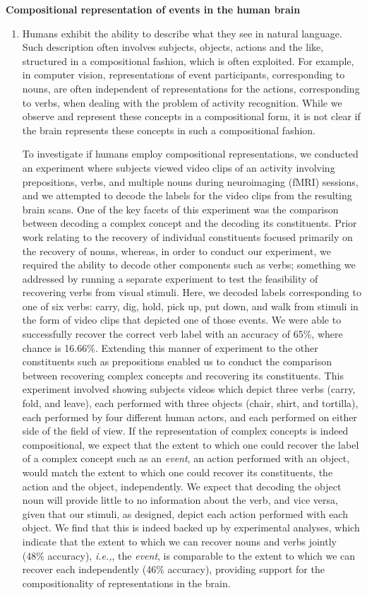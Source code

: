 \documentclass[10pt]{article}
\newenvironment{researchBlock}[1]{%
  \vspace*{0.5ex}
  {\large \textbf{#1}}
  \begin{enumerate}\item[]}
  {\end{enumerate}}
\newcommand{\ie}{\emph{i.e.,}}
\begin{document}
\begin{researchBlock} {Compositional representation of events in the human brain}
  Humans exhibit the ability to describe what they see in natural language.
  Such description often involves subjects, objects, actions and the like,
  structured in a compositional fashion, which is often exploited.
  For example, in computer vision, representations of event participants,
  corresponding to nouns, are often independent of representations for the
  actions, corresponding to verbs, when dealing with the problem of activity
  recognition.
  While we observe and represent these concepts in a compositional form, it is
  not clear if the brain represents these concepts in such a compositional
  fashion.

  To investigate if humans employ compositional representations, we conducted
  an experiment where subjects viewed video clips of an activity involving
  prepositions, verbs, and multiple nouns during neuroimaging (fMRI) sessions,
  and we attempted to decode the labels for the video clips from the resulting
  brain scans.
  One of the key facets of this experiment was the comparison between decoding
  a complex concept and the decoding its constituents.
  Prior work relating to the recovery of individual constituents focused
  primarily on the recovery of nouns, whereas, in order to conduct our
  experiment, we required the ability to decode other components such as verbs;
  something we addressed by running a separate experiment to test the
  feasibility of recovering verbs from visual stimuli.
  Here, we decoded labels corresponding to one of six verbs: carry, dig, hold,
  pick up, put down, and walk from stimuli in the form of video clips that
  depicted one of those events.
  We were able to successfully recover the correct verb label with an accuracy
  of 65\%, where chance is 16.66\%.
  Extending this manner of experiment to the other constituents such as
  prepositions enabled us to conduct the comparison between recovering complex
  concepts and recovering its constituents.
  This experiment involved showing subjects videos which depict three verbs
  (carry, fold, and leave), each performed with three objects (chair, shirt,
  and tortilla), each performed by four different human actors, and each
  performed on either side of the field of view.
  If the representation of complex concepts is indeed compositional, we expect
  that the extent to which one could recover the label of a complex concept
  such as an \emph{event}, an action performed with an object, would match the
  extent to which one could recover its constituents, the action and the
  object, independently.
  We expect that decoding the object noun will provide little to no information
  about the verb, and vice versa, given that our stimuli, as designed, depict
  each action performed with each object.
  We find that this is indeed backed up by experimental analyses, which
  indicate that the extent to which we can recover nouns and verbs jointly
  (48\% accuracy), \ie, the \emph{event}, is comparable to the extent to which
  we can recover each independently (46\% accuracy), providing support for the
  compositionality of representations in the brain.


\end{researchBlock}
\end{document}
